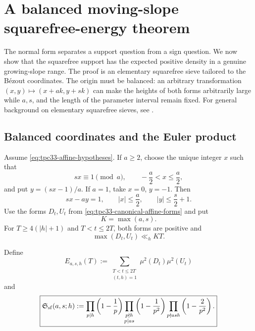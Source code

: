 \section{A balanced moving-slope squarefree-energy theorem}
\label{sec:tpc33-squarefree-energy}

The normal form separates a support question from a sign question.  We now
show that the squarefree support has the expected positive density in a
genuine growing-slope range.  The proof is an elementary squarefree sieve
tailored to the B\'ezout coordinates.  The origin must be balanced: an
arbitrary transformation \((x,y)\mapsto(x+ak,y+sk)\) can make the heights
of both forms arbitrarily large while \(a,s\), and the length of the
parameter interval remain fixed.
For general background on elementary squarefree sieves, see
\citet{IwaniecKowalski2004}.

\subsection{Balanced coordinates and the Euler product}

Assume \eqref{eq:tpc33-affine-hypotheses}.  If \(a\ge2\), choose the unique
integer \(x\) such that
\begin{equation}
 sx\equiv1\pmod a,\qquad -\frac a2<x\le\frac a2,
 \label{eq:tpc33-balanced-x}
\end{equation}
and put \(y=(sx-1)/a\).  If \(a=1\), take \(x=0\), \(y=-1\).  Then
\begin{equation}
 sx-ay=1,\qquad |x|\le\frac a2,\qquad
 |y|\le\frac s2+1.
 \label{eq:tpc33-balanced-bounds}
\end{equation}
Use the forms \(D_t,U_t\) from
\eqref{eq:tpc33-canonical-affine-forms} and put
\begin{equation}
 K=\max(a,s).
 \label{eq:tpc33-K}
\end{equation}
For \(T\ge4(|h|+1)\) and \(T<t\le2T\), both forms are positive and
\begin{equation}
 \max(D_t,U_t)\ll_h KT.
 \label{eq:tpc33-affine-height}
\end{equation}

Define
\begin{equation}
 E_{a,s,h}(T)
 :=\sum_{\substack{T<t\le2T\\(t,h)=1}}
 \mu^2(D_t)\mu^2(U_t)
 \label{eq:tpc33-squarefree-energy}
\end{equation}
and
\begin{equation}
 \boxed{
 \mathfrak S_{\rm sf}(a,s;h)
 :=\prod_{p\mid h}\left(1-\frac1p\right)
 \prod_{\substack{p\nmid h\\p\mid as}}
       \left(1-\frac1{p^2}\right)
 \prod_{p\nmid ash}\left(1-\frac2{p^2}\right).}
 \label{eq:tpc33-squarefree-singular-series}
\end{equation}

